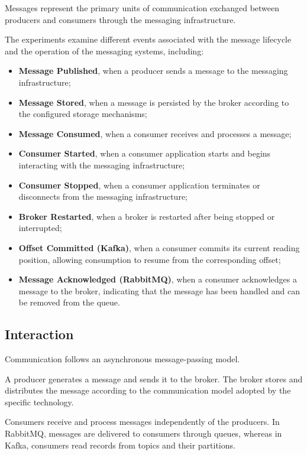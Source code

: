 \documentclass{scrartcl}
\begin{document}
Messages represent the primary units of communication exchanged between producers and consumers through the messaging infrastructure.

The experiments examine different events associated with the message lifecycle and the operation of the messaging systems, including:

\begin{itemize}
    \item \textbf{Message Published}, when a producer sends a message to the messaging infrastructure;
    \item \textbf{Message Stored}, when a message is persisted by the broker according to the configured storage mechanisms;
    \item \textbf{Message Consumed}, when a consumer receives and processes a message;
    \item \textbf{Consumer Started}, when a consumer application starts and begins interacting with the messaging infrastructure;
    \item \textbf{Consumer Stopped}, when a consumer application terminates or disconnects from the messaging infrastructure;
    \item \textbf{Broker Restarted}, when a broker is restarted after being stopped or interrupted;
    \item \textbf{Offset Committed (Kafka)}, when a consumer commits its current reading position, allowing consumption to resume from the corresponding offset;
    \item \textbf{Message Acknowledged (RabbitMQ)}, when a consumer acknowledges a message to the broker, indicating that the message has been handled and can be removed from the queue.
\end{itemize}

\subsection{Interaction}\label{interaction}

Communication follows an asynchronous message-passing model.

A producer generates a message and sends it to the broker. The broker stores and distributes the message according to the communication model adopted by the specific technology.

Consumers receive and process messages independently of the producers. In RabbitMQ, messages are delivered to consumers through queues, whereas in Kafka, consumers read records from topics and their partitions.
\end{document}
